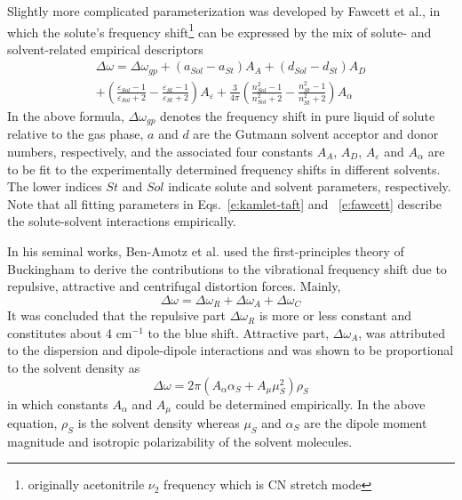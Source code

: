 \documentclass[a4paper,titlepage,twoside,fleqn,12pt]{book}
\begin{document}
\begin{refsection}
Slightly more complicated parameterization was developed 
by Fawcett et al.\citep{Reimers.Hall.JACS.1999,Fawcett.Liu.Kessler.JPC.1993,Fawcett.Kloss.JCP.1996},
in which the solute's frequency shift\footnote{originally acetonitrile $\nu_2$ frequency
which is CN stretch mode} can be expressed by the mix of solute- and
solvent-related empirical descriptors
%
\begin{multline} \label{e:fawcett}
\Delta \omega = \Delta \omega_{gp} + 
\left( a_{Sol} - a_{St} \right) A_A +
\left( d_{Sol} - d_{St} \right) A_D \\ + 
\left( \frac{\varepsilon_{Sol}-1}{\varepsilon_{Sol}+2} - \frac{\varepsilon_{St}-1}{\varepsilon_{St}+2} \right) A_\varepsilon +
\frac{3}{4\pi}
\left( \frac{n^2_{Sol}-1}{n^2_{Sol}+2} - \frac{n^2_{St}-1}{n^2_{St}+2} \right) A_\alpha
\end{multline}
%
In the above formula, $\Delta \omega_{gp}$ denotes the frequency shift in pure liquid of solute
relative to the gas phase,
$a$ and $d$ are the Gutmann solvent acceptor and donor numbers\citep{Gutmann.Resch.Linert.CoordChemRev.1982}, 
respectively,
and the associated four constants $A_A$, $A_D$, $A_\varepsilon$ and $A_\alpha$ 
are to be fit to the experimentally determined frequency shifts in different solvents.
The lower indices $St$ and $Sol$ indicate solute and solvent parameters, respectively. 
Note that all fitting parameters in Eqs.~\eqref{e:kamlet-taft} and ~\eqref{e:fawcett} 
describe the solute-solvent interactions empirically.

In his seminal works, Ben-Amotz et al.\citep{Ben-Amotz.Lee.Cho.List.JCP.1992} 
used the first-principles theory of Buckingham\citep{Buckingham.ProcRSocLondonA.1958,
Buckingham.ProcRSocLondonA.1960,Buckingham.TransFaradaySoc.1960}
to derive the contributions to the vibrational frequency shift due to
repulsive, attractive and centrifugal distortion forces. Mainly,
%
\begin{equation} \label{e:ben-amotz}
 \Delta \omega = \Delta \omega_R + \Delta \omega_A + \Delta \omega_C
\end{equation}
%
It was concluded that the repulsive part $\Delta \omega_R$ is more or less constant
and constitutes about 4 cm$^{-1}$ to the blue shift. Attractive part, $\Delta \omega_A$,
was attributed to the dispersion and dipole-dipole interactions
and was shown to be proportional to the solvent density as
%
\begin{equation} \label{e:ben-amotz-ro}
 \Delta \omega = 2\pi\left( A_\alpha \alpha_S + A_\mu \mu_S^2 \right) \rho_S
\end{equation}
%
in which constants $A_\alpha$ and $A_\mu$ could be determined empirically. 
In the above equation, $\rho_S$ is the solvent density whereas $\mu_S$ and $\alpha_S$ are the
dipole moment magnitude and isotropic polarizability of the solvent molecules.


\end{refsection}
\end{document}
